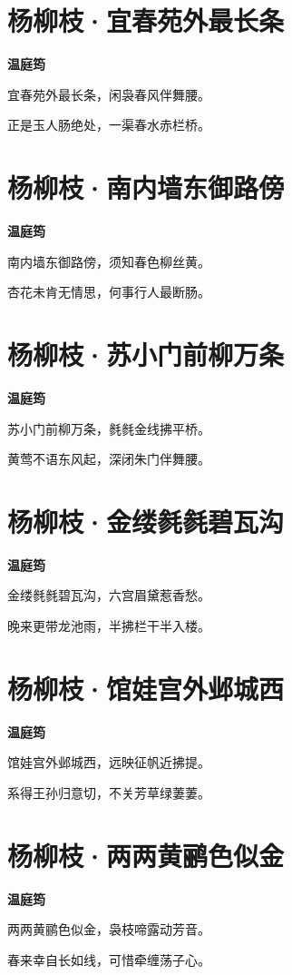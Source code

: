 \documentclass[12pt,a4paper]{ctexbook}
\begin{document}
\section{杨柳枝·宜春苑外最长条}
\textbf{温庭筠}\par\vspace{0.5em}
宜春苑外最长条，闲袅春风伴舞腰。\par
正是玉人肠绝处，一渠春水赤栏桥。\par

\section{杨柳枝·南内墙东御路傍}
\textbf{温庭筠}\par\vspace{0.5em}
南内墙东御路傍，须知春色柳丝黄。\par
杏花未肯无情思，何事行人最断肠。\par

\section{杨柳枝·苏小门前柳万条}
\textbf{温庭筠}\par\vspace{0.5em}
苏小门前柳万条，毵毵金线拂平桥。\par
黄莺不语东风起，深闭朱门伴舞腰。\par

\section{杨柳枝·金缕毵毵碧瓦沟}
\textbf{温庭筠}\par\vspace{0.5em}
金缕毵毵碧瓦沟，六宫眉黛惹香愁。\par
晚来更带龙池雨，半拂栏干半入楼。\par

\section{杨柳枝·馆娃宫外邺城西}
\textbf{温庭筠}\par\vspace{0.5em}
馆娃宫外邺城西，远映征帆近拂提。\par
系得王孙归意切，不关芳草绿萋萋。\par

\section{杨柳枝·两两黄鹂色似金}
\textbf{温庭筠}\par\vspace{0.5em}
两两黄鹂色似金，袅枝啼露动芳音。\par
春来幸自长如线，可惜牵缠荡子心。\par
\end{document}
